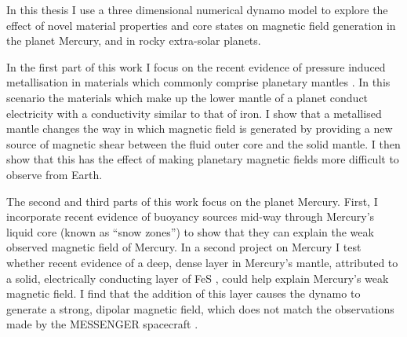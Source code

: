 In this thesis I use a three dimensional numerical dynamo model to explore the effect of novel material properties and core states on magnetic field generation in the planet Mercury, and in rocky extra-solar planets.

In the first part of this work I focus on the recent evidence of pressure induced metallisation in materials which commonly comprise planetary mantles \citep{nellis2010, tsuchiya2011, ohta2012}. In this scenario the materials which make up the lower mantle of a planet conduct electricity with a conductivity similar to that of iron. I show that a metallised mantle changes the way in which magnetic field is generated by providing a new source of magnetic shear between the fluid outer core and the solid mantle. I then show that this has the effect of making planetary magnetic fields more difficult to observe from Earth. 

The second and third parts of this work focus on the planet Mercury. First, I incorporate recent evidence \citep{chenetal2008} of buoyancy sources mid-way through Mercury's liquid core (known as ``snow zones'') to show that they can explain the weak observed magnetic field of Mercury. In a second project on Mercury I test whether recent evidence of a deep, dense layer in Mercury's mantle, attributed to a solid, electrically conducting layer of FeS \citep{smith2012, hauck2013}, could help explain Mercury's weak magnetic field. I find that the addition of this layer causes the dynamo to generate a strong, dipolar magnetic field, which does not match the observations made by the MESSENGER spacecraft \citep{anderson2012}.